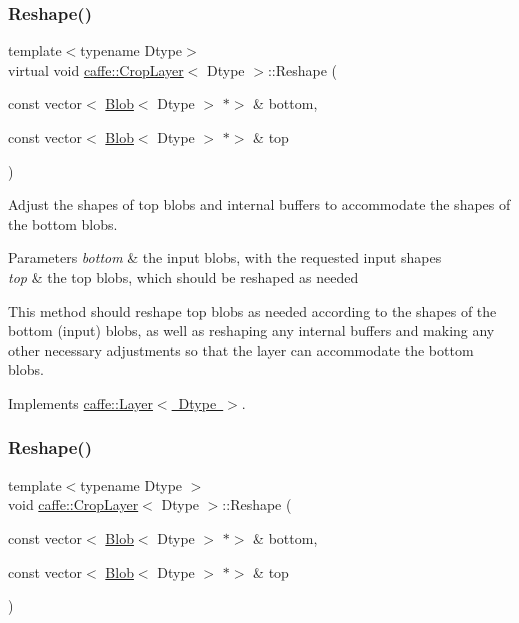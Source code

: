 \subsubsection{\texorpdfstring{Reshape()}{Reshape()}\hspace{0.1cm}{\footnotesize\ttfamily [1/2]}}
{\footnotesize\ttfamily template$<$typename Dtype$>$ \\
virtual void \mbox{\hyperlink{classcaffe_1_1_crop_layer}{caffe\+::\+Crop\+Layer}}$<$ Dtype $>$\+::Reshape (\begin{DoxyParamCaption}\item[{const vector$<$ \mbox{\hyperlink{classcaffe_1_1_blob}{Blob}}$<$ Dtype $>$ $\ast$$>$ \&}]{bottom,  }\item[{const vector$<$ \mbox{\hyperlink{classcaffe_1_1_blob}{Blob}}$<$ Dtype $>$ $\ast$$>$ \&}]{top }\end{DoxyParamCaption})\hspace{0.3cm}{\ttfamily [virtual]}}



Adjust the shapes of top blobs and internal buffers to accommodate the shapes of the bottom blobs. 


\begin{DoxyParams}{Parameters}
{\em bottom} & the input blobs, with the requested input shapes \\
\hline
{\em top} & the top blobs, which should be reshaped as needed\\
\hline
\end{DoxyParams}
This method should reshape top blobs as needed according to the shapes of the bottom (input) blobs, as well as reshaping any internal buffers and making any other necessary adjustments so that the layer can accommodate the bottom blobs. 

Implements \mbox{\hyperlink{classcaffe_1_1_layer_a7fe981e8af8d93d587acf2a952be563d}{caffe\+::\+Layer$<$ Dtype $>$}}.

\mbox{\label{classcaffe_1_1_crop_layer_a195d2e437a70b0139411c1dd22b08120}} 
\subsubsection{\texorpdfstring{Reshape()}{Reshape()}\hspace{0.1cm}{\footnotesize\ttfamily [2/2]}}
{\footnotesize\ttfamily template$<$typename Dtype $>$ \\
void \mbox{\hyperlink{classcaffe_1_1_crop_layer}{caffe\+::\+Crop\+Layer}}$<$ Dtype $>$\+::Reshape (\begin{DoxyParamCaption}\item[{const vector$<$ \mbox{\hyperlink{classcaffe_1_1_blob}{Blob}}$<$ Dtype $>$ $\ast$$>$ \&}]{bottom,  }\item[{const vector$<$ \mbox{\hyperlink{classcaffe_1_1_blob}{Blob}}$<$ Dtype $>$ $\ast$$>$ \&}]{top }\end{DoxyParamCaption})\hspace{0.3cm}{\ttfamily [virtual]}}




